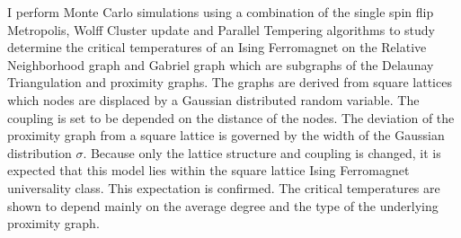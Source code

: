 I perform Monte Carlo simulations using a combination of the single spin
flip Metropolis, Wolff Cluster update and Parallel Tempering algorithms
to study determine the critical temperatures of an Ising Ferromagnet on
the Relative Neighborhood graph and Gabriel graph which are subgraphs of
the Delaunay Triangulation and proximity graphs. The graphs are derived
from square lattices which nodes are displaced by a Gaussian distributed
random variable. The coupling is set to be depended on the distance of
the nodes. The deviation of the proximity graph from a square lattice is
governed by the width of the Gaussian distribution \(\sigma\). Because
only the lattice structure and coupling is changed, it is expected that
this model lies within the square lattice Ising Ferromagnet universality
class. This expectation is confirmed.
The critical temperatures are shown to depend mainly on the average degree
and the type of the underlying proximity graph.
